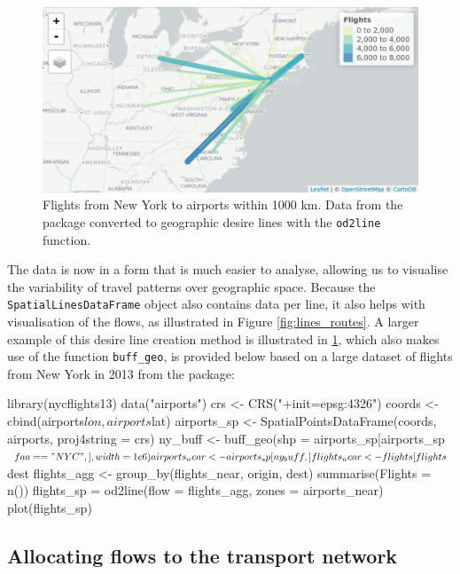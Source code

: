 \begin{figure}
\includegraphics[width=\textwidth]{flights} \caption[Flights from New York]{Flights from New York to airports within 1000 km. Data from the  package converted to geographic desire lines with the \texttt{od2line} function.}\label{fig:flights}
\end{figure}

The data is now in a form that is much easier to analyse, allowing us to visualise
the variability of travel patterns over geographic space.
Because the \texttt{SpatialLinesDataFrame} object also contains
data per line, it also helps with visualisation of the flows, as
illustrated in Figure \ref{fig:lines_routes}.
A larger example of this desire line creation method is illustrated in \ref{fig:flights}, which also makes use of the function \texttt{buff\_geo}, is provided below based on a large dataset of flights from New York in 2013 from the  package:

\begin{Schunk}
\begin{Sinput}
library(nycflights13)
data("airports")
crs <- CRS("+init=epsg:4326")
coords <- cbind(airports$lon, airports$lat)
airports_sp <- SpatialPointsDataFrame(coords, airports, proj4string = crs)
ny_buff <- buff_geo(shp = airports_sp[airports_sp$faa == "NYC",], width = 1e6)
airports_near <- airports_sp[ny_buff,]
flights_near <- flights[flights$dest %
flights_agg <- group_by(flights_near, origin, dest) %
  summarise(Flights = n())
flights_sp = od2line(flow = flights_agg, zones = airports_near)
plot(flights_sp)
\end{Sinput}
\end{Schunk}

\subsection{Allocating flows to the transport
network}\label{allocating-flows-to-the-transport-network}

